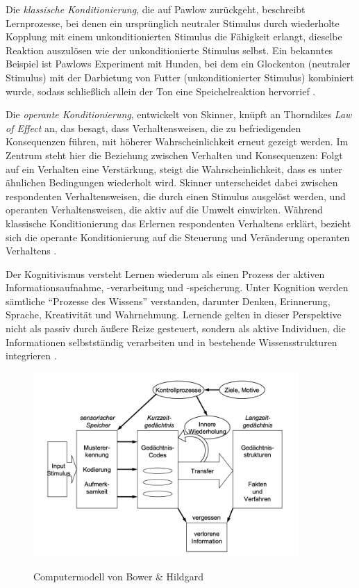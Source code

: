 Die \textit{klassische Konditionierung}, die auf Pawlow zurückgeht, beschreibt Lernprozesse, bei denen ein ursprünglich neutraler Stimulus durch wiederholte Kopplung mit einem unkonditionierten Stimulus die Fähigkeit erlangt, dieselbe Reaktion auszulösen wie der unkonditionierte Stimulus selbst. Ein bekanntes Beispiel ist Pawlows Experiment mit Hunden, bei dem ein Glockenton (neutraler Stimulus) mit der Darbietung von Futter (unkonditionierter Stimulus) kombiniert wurde, sodass schließlich allein der Ton eine Speichelreaktion hervorrief \parencite[S.~7--10]{furstenau_lehr-lern-theorien_2019}.

Die \textit{operante Konditionierung}, entwickelt von Skinner, knüpft an Thorndikes \textit{Law of Effect} an, das besagt, dass Verhaltensweisen, die zu befriedigenden Konsequenzen führen, mit höherer Wahrscheinlichkeit erneut gezeigt werden. Im Zentrum steht hier die Beziehung zwischen Verhalten und Konsequenzen: Folgt auf ein Verhalten eine Verstärkung, steigt die Wahrscheinlichkeit, dass es unter ähnlichen Bedingungen wiederholt wird. Skinner unterscheidet dabei zwischen respondenten Verhaltensweisen, die durch einen Stimulus ausgelöst werden, und operanten Verhaltensweisen, die aktiv auf die Umwelt einwirken. Während klassische Konditionierung das Erlernen respondenten Verhaltens erklärt, bezieht sich die operante Konditionierung auf die Steuerung und Veränderung operanten Verhaltens \parencite[S.~15--17]{furstenau_lehr-lern-theorien_2019}.

Der Kognitivismus versteht Lernen wiederum als einen Prozess der aktiven Informationsaufnahme, -verarbeitung und -speicherung. Unter Kognition werden sämtliche \enquote{Prozesse des Wissens} verstanden, darunter Denken, Erinnerung, Sprache, Kreativität und Wahrnehmung. Lernende gelten in dieser Perspektive nicht als passiv durch äußere Reize gesteuert, sondern als aktive Individuen, die Informationen selbstständig verarbeiten und in bestehende Wissensstrukturen integrieren \parencite[S.~1]{furstenau_lehr-lern-theorien_2019}.

\begin{figure}[htbp]
    \centering
    \includegraphics[width=0.90\textwidth]{img/Computermodell.png}
    \caption{Computermodell von Bower \& Hildgard }
	\parencite[S.~234]{bower_theorie_1984}
    \label{fig:computermodell}
\end{figure}

